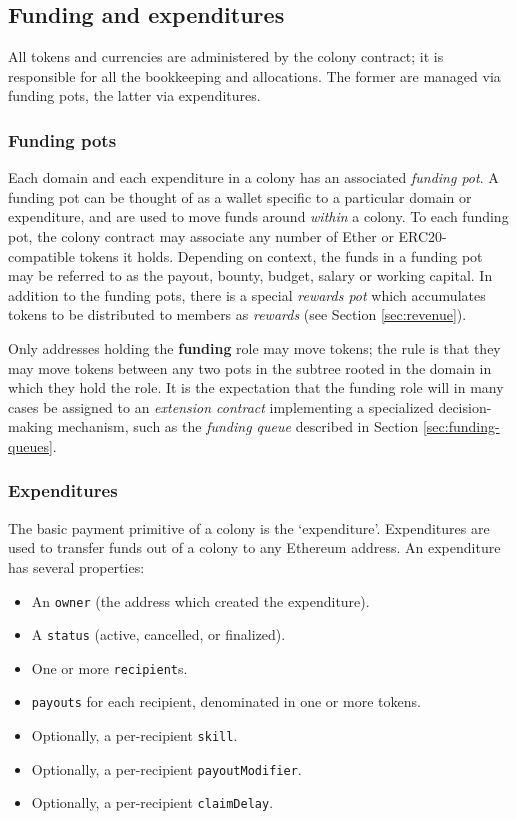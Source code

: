 \subsection{Funding and expenditures}\label{sec:expenditures}\label{sec:finance}

All tokens and currencies are administered by the colony contract; it is responsible for all the bookkeeping and allocations. The former are managed via funding pots, the latter via expenditures.

\subsubsection{Funding pots}

Each domain and each expenditure in a colony has an associated \emph{funding pot}. A funding pot can be thought of as a wallet specific to a particular domain or expenditure, and are used to move funds around \textit{within} a colony. To each funding pot, the colony contract may associate any number of Ether or ERC20-compatible tokens it holds. Depending on context, the funds in a funding pot may be referred to as the payout, bounty, budget, salary or working capital. In addition to the funding pots, there is a special \emph{rewards pot} which accumulates tokens to be distributed to members as \textit{rewards} (see Section \ref{sec:revenue}).

Only addresses holding the \textbf{funding} role may move tokens; the rule is that they may move tokens between any two pots in the subtree rooted in the domain in which they hold the role. It is the expectation that the funding role will in many cases be assigned to an \textit{extension contract} implementing a specialized decision-making mechanism, such as the \textit{funding queue} described in Section \ref{sec:funding-queues}.

\subsubsection{Expenditures}

The basic payment primitive of a colony is the `expenditure'. Expenditures are used to transfer funds out of a colony to any Ethereum address. An expenditure has several properties:

\begin{itemize}
\item An \texttt{owner} (the address which created the expenditure).
\item A \texttt{status} (active, cancelled, or finalized).
\item One or more \texttt{recipient}s.
\item \texttt{payouts} for each recipient, denominated in one or more tokens.
\item Optionally, a per-recipient \texttt{skill}.
\item Optionally, a per-recipient \texttt{payoutModifier}.
\item Optionally, a per-recipient \texttt{claimDelay}.
\end{itemize}

